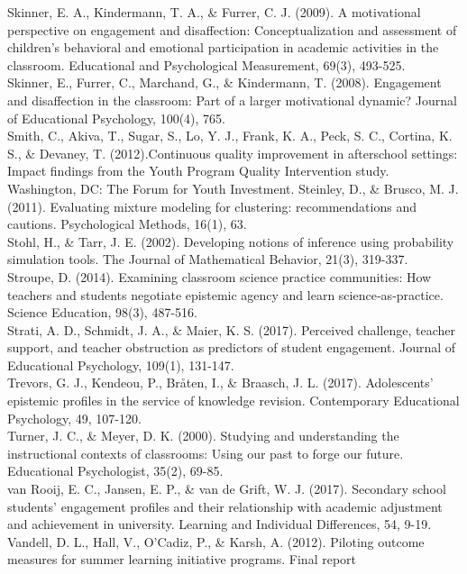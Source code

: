 \documentclass[]{book}
\theoremstyle{definition}
\theoremstyle{definition}
\theoremstyle{definition}
\theoremstyle{remark}
\begin{document}
Skinner, E. A., Kindermann, T. A., \& Furrer, C. J. (2009). A
motivational perspective on engagement and disaffection:
Conceptualization and assessment of children's behavioral and emotional
participation in academic activities in the classroom. Educational and
Psychological Measurement, 69(3), 493-525.\\
Skinner, E., Furrer, C., Marchand, G., \& Kindermann, T. (2008).
Engagement and disaffection in the classroom: Part of a larger
motivational dynamic? Journal of Educational Psychology, 100(4), 765.\\
Smith, C., Akiva, T., Sugar, S., Lo, Y. J., Frank, K. A., Peck, S. C.,
Cortina, K. S., \& Devaney, T. (2012).Continuous quality improvement in
afterschool settings: Impact findings from the Youth Program Quality
Intervention study. Washington, DC: The Forum for Youth Investment.
Steinley, D., \& Brusco, M. J. (2011). Evaluating mixture modeling for
clustering: recommendations and cautions. Psychological Methods, 16(1),
63.\\
Stohl, H., \& Tarr, J. E. (2002). Developing notions of inference using
probability simulation tools. The Journal of Mathematical Behavior,
21(3), 319-337.\\
Stroupe, D. (2014). Examining classroom science practice communities:
How teachers and students negotiate epistemic agency and learn
science‐as‐practice. Science Education, 98(3), 487-516.\\
Strati, A. D., Schmidt, J. A., \& Maier, K. S. (2017). Perceived
challenge, teacher support, and teacher obstruction as predictors of
student engagement. Journal of Educational Psychology, 109(1),
131-147.\\
Trevors, G. J., Kendeou, P., Bråten, I., \& Braasch, J. L. (2017).
Adolescents' epistemic profiles in the service of knowledge revision.
Contemporary Educational Psychology, 49, 107-120.\\
Turner, J. C., \& Meyer, D. K. (2000). Studying and understanding the
instructional contexts of classrooms: Using our past to forge our
future. Educational Psychologist, 35(2), 69-85.\\
van Rooij, E. C., Jansen, E. P., \& van de Grift, W. J. (2017).
Secondary school students' engagement profiles and their relationship
with academic adjustment and achievement in university. Learning and
Individual Differences, 54, 9-19.\\
Vandell, D. L., Hall, V., O'Cadiz, P., \& Karsh, A. (2012). Piloting
outcome measures for summer learning initiative programs. Final report
\end{document}
